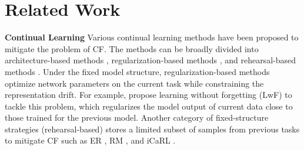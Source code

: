 \section{Related Work}
\textbf{Continual Learning}
Various continual learning methods have been proposed to mitigate the problem of CF. The methods can be broadly divided into architecture-based methods \cite{yoon2018lifelong,serra18a}, regularization-based methods \citet{li2017learning,kirkpatrick2017overcoming}, and rehearsal-based methods \cite{NEURIPS2019_fa7cdfad}.
Under the fixed model structure, regularization-based methods \cite{kirkpatrick2017overcoming,aljundi2018memory,li2017learning} optimize network parameters on the current task while constraining the representation drift. For example, \citet{li2017learning} propose learning without forgetting (LwF) to tackle this problem, which regularizes the model output of current data close to those trained for the previous model. Another category of fixed-structure strategies (rehearsal-based) stores a limited subset of samples from previous tasks to mitigate CF such as ER \cite{NEURIPS2019_fa7cdfad}, RM \cite{Bang_2021_CVPR}, and iCaRL \cite{Rebuffi_2017_CVPR}.







